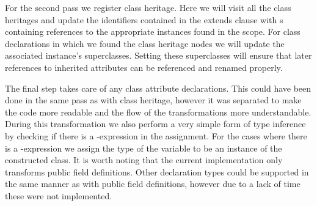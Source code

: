 For the second pass we register class heritage.
Here we will visit all the class heritages and update the identifiers contained in the extends clause with s containing references to the appropriate  instances found in the scope.
For class declarations in which we found the class heritage nodes we will update the associated  instance's superclasses.
Setting these superclasses will ensure that later references to inherited attributes can be referenced and renamed properly.

The final step takes care of any class attribute declarations.
This could have been done in the same pass as with class heritage, however it was separated to make the code more readable and the flow of the transformations more understandable.
During this transformation we also perform a very simple form of type inference by checking if there is a -expression in the assignment.
For the cases where there is a -expression we assign the type of the variable to be an instance of the constructed class.
It is worth noting that the current implementation only transforms public field definitions.
Other declaration types could be supported in the same manner as with public field definitions, however due to a lack of time these were not implemented.

